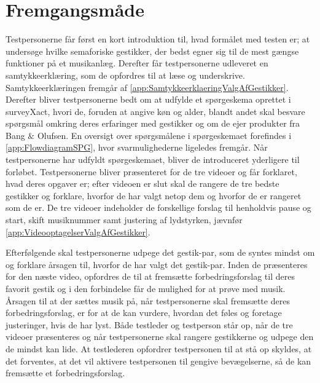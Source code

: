 \section{Fremgangsmåde}
\label{FremgangsmaadeValgAfGestikker}
%
Testpersonerne får først en kort introduktion til, hvad formålet med testen er; at undersøge hvilke semaforiske gestikker, der bedst egner sig til de mest gængse funktioner på et musikanlæg. Derefter får testpersonerne udleveret en samtykkeerklæring, som de opfordres til at læse og underskrive. Samtykkeerklæringen fremgår af \autoref{app:SamtykkeerklaeringValgAfGestikker}. Derefter bliver testpersonerne bedt om at udfylde et spørgeskema oprettet i surveyXact, hvori de, foruden at angive køn og alder, blandt andet skal besvare spørgsmål omkring deres erfaringer med gestikker og om de ejer produkter fra Bang $\&$ Olufsen. En oversigt over spørgsmålene i spørgeskemaet forefindes i \autoref{app:FlowdiagramSPG}, hvor svarmulighederne ligeledes fremgår. Når testpersonerne har udfyldt spørgeskemaet, bliver de introduceret yderligere til forløbet. Testpersonerne bliver præsenteret for de tre videoer og får forklaret, hvad deres opgaver er; efter videoen er slut skal de rangere de tre bedste gestikker og forklare, hvorfor de har valgt netop dem og hvorfor de er rangeret som de er. De tre videoer indeholder de forskellige forslag til henholdvis pause og start, skift musiknummer samt justering af lydstyrken, jævnfør \autoref{app:VideooptagelserValgAfGestikker}. 

Efterfølgende skal testpersonerne udpege det gestik-par, som de syntes mindst om og forklare årsagen til, hvorfor de har valgt det gestik-par. Inden de præsenteres for den næste video, opfordres de til at fremsætte forbedringsforslag til deres favorit gestik og i den forbindelse får de mulighed for at prøve med musik. Årsagen til at der sættes musik på, når testpersonerne skal fremsætte deres forbedringsforslag, er for at de kan vurdere, hvordan det føles og foretage justeringer, hvis de har lyst. Både testleder og testperson står op, når de tre videoer præsenteres og når testpersonerne skal rangere gestikkerne og udpege den de mindst kan lide. At testlederen opfordrer testpersonen til at stå op skyldes, at det forventes, at det vil aktivere testpersonen til gengive bevægelserne, så de kan fremsætte et forbedringsforslag. 

